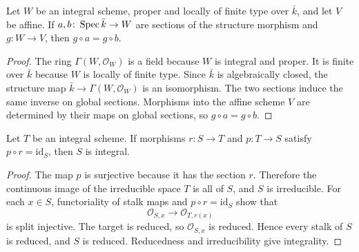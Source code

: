 \begin{lemma}
  \label{lem:eq_comp_of_isAffine_of_properIntegral}
  \leanok
  Let \(W\) be an integral scheme, proper and locally of finite type over \(\bar k\),
  and let \(V\) be affine.  If \(a,b\colon\operatorname{Spec}\bar k\to W\) are sections of the
  structure morphism and \(g\colon W\to V\), then \(g\circ a=g\circ b\).
\end{lemma}
\begin{proof}
  \leanok
  The ring \(\Gamma(W,\mathcal O_W)\) is a field because \(W\) is integral and
  proper.  It is finite over \(\bar k\) because \(W\) is locally of finite type.
  Since \(\bar k\) is algebraically closed, the structure map
  \(\bar k\to\Gamma(W,\mathcal O_W)\) is an isomorphism.  The two sections induce
  the same inverse on global sections.  Morphisms into the affine scheme \(V\) are
  determined by their maps on global sections, so \(g\circ a=g\circ b\).
\end{proof}

\begin{lemma}
  \label{lem:isIntegral_of_retract_of_integral}
  \leanok
  Let \(T\) be an integral scheme.  If morphisms \(r\colon S\to T\) and
  \(p\colon T\to S\) satisfy \(p\circ r=\mathrm{id}_S\), then \(S\) is integral.
\end{lemma}
\begin{proof}
  \leanok
  The map \(p\) is surjective because it has the section \(r\).  Therefore the
  continuous image of the irreducible space \(T\) is all of \(S\), and \(S\) is
  irreducible.  For each \(x\in S\), functoriality of stalk maps and
  \(p\circ r=\mathrm{id}_S\) show that
  \[
    \mathcal O_{S,x}\longrightarrow\mathcal O_{T,r(x)}
  \]
  is split injective.  The target is reduced, so \(\mathcal O_{S,x}\) is reduced.
  Hence every stalk of \(S\) is reduced, and \(S\) is reduced.  Reducedness and
  irreducibility give integrality.
\end{proof}

